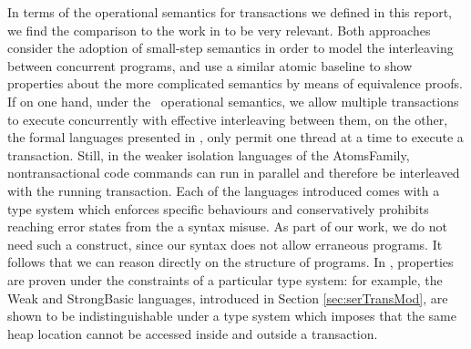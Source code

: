 	In terms of the operational semantics for transactions we defined in this report, we find the comparison to the work in \cite{semanticsTransactions} to be very relevant. Both approaches consider the adoption of small-step semantics in order to model the interleaving between concurrent programs, and use a similar atomic baseline to show properties about the more complicated semantics by means of equivalence proofs. If on one hand, under the \tpl\ operational semantics, we allow multiple transactions to execute concurrently with effective interleaving between them, on the other, the formal languages presented in \cite{semanticsTransactions}, only permit one thread at a time to execute a transaction. Still, in the weaker isolation languages of the \textsf{AtomsFamily}, nontransactional code commands can run in parallel and therefore be interleaved with the running transaction. Each of the languages introduced comes with a type system which enforces specific behaviours and conservatively prohibits reaching error states from the a syntax misuse. As part of our work, we do not need such a construct, since our syntax does not allow erraneous programs. It follows that we can reason directly on the structure of programs. In \cite{semanticsTransactions}, properties are proven under the constraints of a particular type system: for example, the \textsf{Weak} and \textsf{StrongBasic} languages, introduced in Section \ref{sec:serTransMod}, are shown to be indistinguishable under a type system which imposes that the same heap location cannot be accessed inside and outside a transaction.